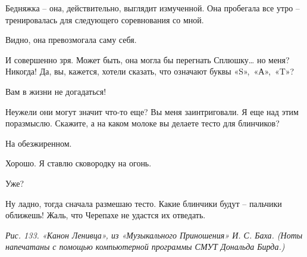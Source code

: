 \documentclass[../main.tex]{subfiles}
\begin{document}
\begin{dialogue}
 Бедняжка \--- она, действительно, выглядит измученной. Она пробегала все утро \--- тренировалась для следующего соревнования со мной.

 Видно, она превозмогала саму себя.

 И совершенно зря. Может быть, она могла бы перегнать Сплюшку\ldots{} но меня? Никогда! Да, вы, кажется, хотели сказать, что означают буквы «S»,~«А»,~«T»?

 Вам в жизни не догадаться!

 Неужели они могут значит что-то еще? Вы меня заинтриговали. Я еще над этим поразмыслю. Скажите, а на каком молоке вы делаете тесто для блинчиков?

 На обезжиренном.

 Хорошо. Я ставлю сковородку на огонь.

 Уже?

 Ну ладно, тогда сначала размешаю тесто. Какие блинчики будут \--- пальчики оближешь! Жаль, что Черепахе не удастся их отведать.

\emph{Рис. 133. «Канон Ленивца», из «Музыкального Приношения» И. С. Баха. (Ноты напечатаны с помощью компьютерной программы СМУТ Дональда Бирда.)}

\end{dialogue}
\end{document}
